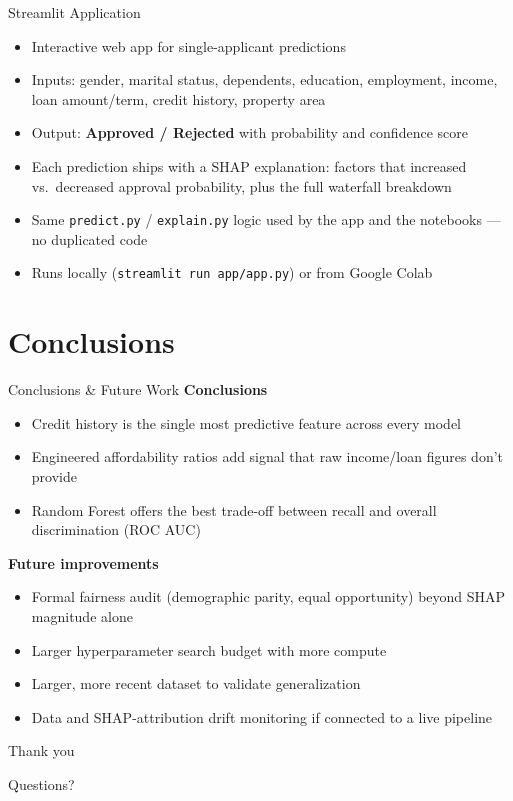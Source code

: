 \documentclass[aspectratio=169]{beamer}
\begin{document}
\begin{frame}{Streamlit Application}
    \begin{itemize}
        \item Interactive web app for single-applicant predictions
        \item Inputs: gender, marital status, dependents, education, employment, income, loan amount/term, credit history, property area
        \item Output: \textbf{Approved / Rejected} with probability and confidence score
        \item Each prediction ships with a SHAP explanation: factors that increased vs.\ decreased approval probability, plus the full waterfall breakdown
        \item Same \texttt{predict.py} / \texttt{explain.py} logic used by the app and the notebooks --- no duplicated code
        \item Runs locally (\texttt{streamlit run app/app.py}) or from Google Colab
    \end{itemize}
\end{frame}

\section{Conclusions}

\begin{frame}{Conclusions \& Future Work}
    \textbf{Conclusions}
    \begin{itemize}
        \item Credit history is the single most predictive feature across every model
        \item Engineered affordability ratios add signal that raw income/loan figures don't provide
        \item Random Forest offers the best trade-off between recall and overall discrimination (ROC AUC)
    \end{itemize}
    \vspace{0.3cm}
    \textbf{Future improvements}
    \begin{itemize}
        \item Formal fairness audit (demographic parity, equal opportunity) beyond SHAP magnitude alone
        \item Larger hyperparameter search budget with more compute
        \item Larger, more recent dataset to validate generalization
        \item Data and SHAP-attribution drift monitoring if connected to a live pipeline
    \end{itemize}
\end{frame}

\begin{frame}
    \centering
    \Huge Thank you
    \vspace{0.5cm}

    \normalsize Questions?
\end{frame}
\end{document}

